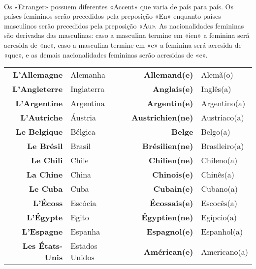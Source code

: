 \documentclass{article}
\begin{document}
    \paragraph{}Os «Etranger» possuem diferentes «Accent» que varia de país para país. Os países femininos serão precedidos pela preposição «En» enquanto países masculinos serão precedidos pela preposição «Au». As nacionalidades femininas são derivadas das masculinas: caso a masculina termine em «ien» a feminina será acresida de «ne», caso a masculina termine em «c» a feminina será acresida de «que», e as demais nacionalidades femininas serão acresidas de «e».

        \begin{center}
            \begin{tabular}{r l c r l}
                \textbf{L'Allemagne}    & Alemanha        &  & \textbf{Allemand(e)}       & Alemã(o)\\
                \textbf{L'Angleterre}   & Inglaterra      &  & \textbf{Anglais(e)}        & Inglês(a)\\
                \textbf{L'Argentine}    & Argentina       &  & \textbf{Argentin(e)}       & Argentino(a)\\
                \textbf{L'Autriche}     & Áustria         &  & \textbf{Austrichien(ne)}   & Austriaco(a)\\
                \textbf{Le Belgique}    & Bélgica         &  & \textbf{Belge}             & Belgo(a)\\
                \textbf{Le Brésil}      & Brasil          &  & \textbf{Brésilien(ne)}     & Brasileiro(a)\\
                \textbf{Le Chili}       & Chile           &  & \textbf{Chilien(ne)}       & Chileno(a)\\
                \textbf{La Chine}       & China           &  & \textbf{Chinois(e)}        & Chinês(a)\\
                \textbf{Le Cuba}        & Cuba            &  & \textbf{Cubain(e)}         & Cubano(a)\\
                \textbf{L'Écoss}        & Escócia         &  & \textbf{Écossais(e)}       & Escocês(a)\\
                \textbf{L'Égypte}       & Egito           &  & \textbf{Égyptien(ne)}      & Egípcio(a)\\
                \textbf{L'Espagne}      & Espanha         &  & \textbf{Espagnol(e)}       & Espanhol(a)\\
                \textbf{Les États-Unis} & Estados Unidos  &  & \textbf{Américan(e)}       & Americano(a)\\

\end{tabular}
\end{center}
\end{document}
